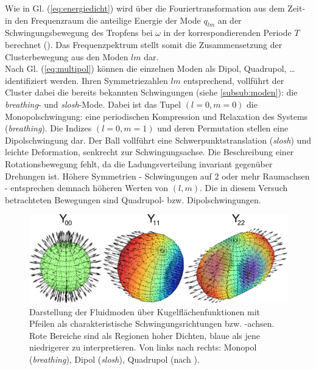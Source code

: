\documentclass[numbers=noenddot,a4paper,notitlepage,twoside,BCOR15mm]{scrbook}
\newcommand{\tilt}[1]{\textit{#1}}
\begin{document}
					Wie in Gl. (\ref{eq:energiedicht}) wird \"uber die Fouriertransformation aus dem Zeit- in den Frequenzraum die anteilige Energie der Mode $q_{lm}$ an der Schwingungsbewegung des Tropfens bei $\omega$ in der korrespondierenden Periode  $T$ berechnet (\cite{Schella13}). Das Frequenzpektrum stellt somit die Zusammensetzung der Clusterbewegung aus den Moden $lm$ dar.\\
					Nach Gl. (\ref{eq:multipol}) k\"onnen die einzelnen Moden als Dipol, Quadrupol, \dots identifiziert werden. Ihren Symmetriezahlen $lm$ entsprechend, vollf\"uhrt der Cluster dabei die bereits bekannten Schwingungen (siehe \ref{subsub:moden}): die \tilt{breathing}- und \tilt{slosh}-Mode. Dabei ist das Tupel $\left(l=0,m=0\right)$ die Monopolschwingung: eine periodischen Kompression und Relaxation des Systems (\tilt{breathing}). Die Indizes $\left(l=0,m=1\right)$ und deren Permutation stellen eine Dipolschwingung dar. Der Ball vollf\"uhrt eine Schwerpunktstranslation (\tilt{slosh}) und leichte Deformation, senkrecht zur Schwingungsachse. Die Beschreibung einer Rotationsbewegung fehlt, da die Ladungsverteilung invariant gegen\"uber Drehungen ist. H\"ohere Symmetrien - Schwingungen auf 2 oder mehr Raumachsen - entsprechen demnach h\"oheren Werten von $\left(l,m\right)$. Die in diesem Versuch betrachteten Bewegungen sind Quadrupol- bzw. Dipolschwingungen.

						\begin{figure}[H]
                            \centering
                            \includegraphics[width=\textwidth,height=0.375\textwidth]{figs/y001122.png}
                            \caption{Darstellung der Fluidmoden über Kugelflächenfunktionen mit Pfeilen als charakteristische Schwingungsrichtungen bzw. -achsen. Rote Bereiche sind als Regionen hoher Dichten, blaue als jene niedrigerer zu interpretieren. Von links nach rechts: Monopol (\tilt{breathing}), Dipol (\tilt{slosh}), Quadrupol (nach \cite{Mulsow13}).}
                            \label{img:fluidmode}
                        \end{figure}
\end{document}
